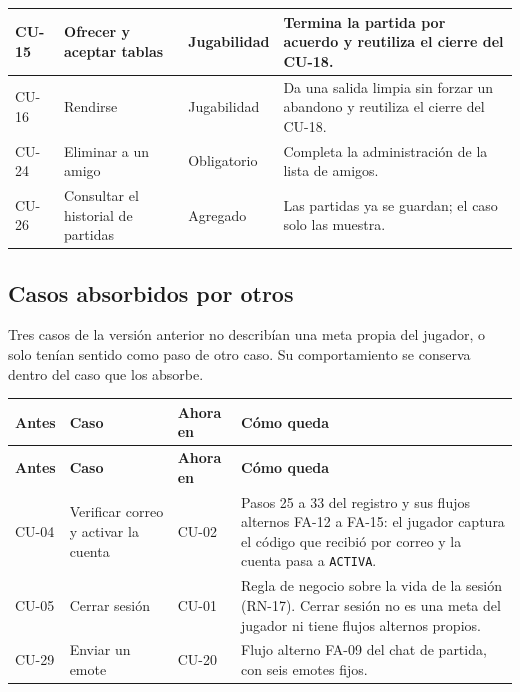 \begin{center}
\begin{longtable}{|L{0.075\textwidth}|L{0.25\textwidth}|L{0.11\textwidth}|L{0.44\textwidth}|}
\mbox{CU-15} & Ofrecer y aceptar tablas & Jugabilidad & Termina la partida por acuerdo y reutiliza el cierre del \mbox{CU-18}. \\ \hline
\mbox{CU-16} & Rendirse & Jugabilidad & Da una salida limpia sin forzar un abandono y reutiliza el cierre del \mbox{CU-18}. \\ \hline
\mbox{CU-24} & Eliminar a un amigo & Obligatorio & Completa la administración de la lista de amigos. \\ \hline
\mbox{CU-26} & Consultar el historial de partidas & Agregado & Las partidas ya se guardan; el caso solo las muestra. \\ \hline
\end{longtable}
\end{center}

\subsection*{Casos absorbidos por otros}

Tres casos de la versión anterior no describían una meta propia del jugador, o solo tenían sentido como paso de otro caso. Su comportamiento se conserva dentro del caso que los absorbe.

\begin{center}\small
\begin{longtable}{|L{0.13\textwidth}|L{0.25\textwidth}|L{0.13\textwidth}|L{0.38\textwidth}|}
\hline
\textbf{Antes} & \textbf{Caso} & \textbf{Ahora en} & \textbf{Cómo queda} \\ \hline
\endfirsthead
\hline
\textbf{Antes} & \textbf{Caso} & \textbf{Ahora en} & \textbf{Cómo queda} \\ \hline
\endhead
CU-04 & Verificar correo y activar la cuenta & \mbox{CU-02} & Pasos 25 a 33 del registro y sus flujos alternos \mbox{FA-12} a \mbox{FA-15}: el jugador captura el código que recibió por correo y la cuenta pasa a \texttt{ACTIVA}. \\ \hline
CU-05 & Cerrar sesión & \mbox{CU-01} & Regla de negocio sobre la vida de la sesión (\mbox{RN-17}). Cerrar sesión no es una meta del jugador ni tiene flujos alternos propios. \\ \hline
CU-29 & Enviar un emote & \mbox{CU-20} & Flujo alterno \mbox{FA-09} del chat de partida, con seis emotes fijos. \\ \hline
\end{longtable}
\end{center}


